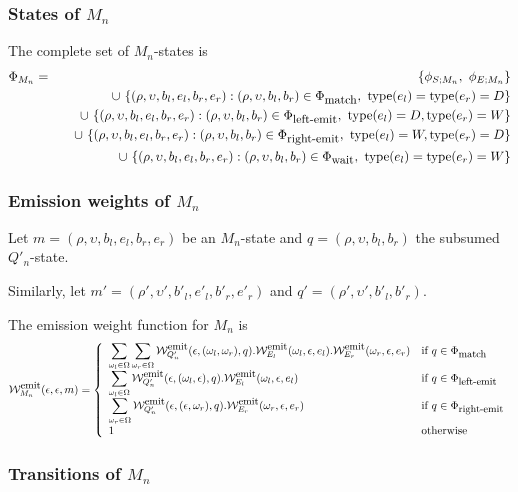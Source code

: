 \documentclass{article}
\newcommand\States{\Phi}
\newcommand\statesof[1]{\States_{#1}}
\newcommand\startstateof[1]{\phi_{S;#1}}
\newcommand\laststateof[1]{\phi_{E;#1}}
\newcommand\weight{{\cal W}}
\newcommand\weightfunof[1]{\weight_{#1}}
\newcommand\emitweightfun[1]{\weightfunof{#1}^{\mbox{\small emit}}}
\newcommand\statetype{\mbox{type}}
\newcommand\stateset[1]{\statesof{\mbox{\small #1}}}
\newcommand\waitsuffix{wait}
\newcommand\waitstates{\stateset{\waitsuffix}}
\newcommand\mstate{(\rho,\upsilon,b_l,e_l,b_r,e_r)}
\newcommand\mstatedest{(\rho',\upsilon',b'_l,e'_l,b'_r,e'_r)}
\newcommand\qstate{(\rho,\upsilon,b_l,b_r)}
\newcommand\qstatedest{(\rho',\upsilon',b'_l,b'_r)}
\newcommand\matchsuffix{match}
\newcommand\leftemitsuffix{left-emit}
\newcommand\rightemitsuffix{right-emit}
\newcommand\matchstates{\stateset{\matchsuffix}}
\newcommand\leftemitstates{\stateset{\leftemitsuffix}}
\newcommand\rightemitstates{\stateset{\rightemitsuffix}}
\begin{document}
\subsubsection{States of $M_n$}
The complete set of $M_n$-states is
\begin{eqnarray*}
\statesof{M_n} & = & \{ \startstateof{M_n},\ \laststateof{M_n} \} \\
& & \quad \cup\ \{ \mstate: \qstate \in \matchstates,\ \statetype(e_l)=\statetype(e_r)=D \} \\
& & \quad \cup\ \{ \mstate: \qstate \in \leftemitstates,\ \statetype(e_l)=D, \statetype(e_r)=W \} \\
& & \quad \cup\ \{ \mstate: \qstate \in \rightemitstates,\ \statetype(e_l)=W, \statetype(e_r)=D \} \\
& & \quad \cup\ \{ \mstate: \qstate \in \waitstates,\ \statetype(e_l)=\statetype(e_r)=W \}
\end{eqnarray*}

\subsubsection{Emission weights of $M_n$}
Let $m = \mstate$ be an $M_n$-state and $q = \qstate$ the subsumed $Q'_n$-state.

Similarly, let $m' = \mstatedest$ and $q' = \qstatedest$.

The emission weight function for $M_n$ is
\[
\emitweightfun{M_n}(\epsilon,\epsilon,m) = \left\{
\begin{array}{ll}
\displaystyle
\sum_{\omega_l \in \Omega}
\sum_{\omega_r \in \Omega}
 \emitweightfun{Q'_n}(\epsilon,(\omega_l,\omega_r),q)
. \emitweightfun{E_l}(\omega_l,\epsilon,e_l)
. \emitweightfun{E_r}(\omega_r,\epsilon,e_r)
 & \mbox{if $q \in \matchstates$} \\
\displaystyle
\sum_{\omega_l \in \Omega}
 \emitweightfun{Q'_n}(\epsilon,(\omega_l,\epsilon),q)
. \emitweightfun{E_l}(\omega_l,\epsilon,e_l)
 & \mbox{if $q \in \leftemitstates$} \\
\displaystyle
\sum_{\omega_r \in \Omega}
 \emitweightfun{Q'_n}(\epsilon,(\epsilon,\omega_r),q)
. \emitweightfun{E_r}(\omega_r,\epsilon,e_r)
 & \mbox{if $q \in \rightemitstates$} \\
1
 & \mbox{otherwise}
\end{array}
\right.
\]

\subsubsection{Transitions of $M_n$}
\end{document}
